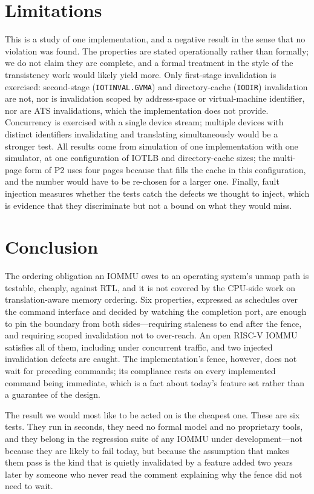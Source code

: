\documentclass[journal]{IEEEtran}
\newcommand{\cmd}[1]{\mbox{\texttt{#1}}}
\begin{document}
\section{Limitations}
This is a study of one implementation, and a negative result in the sense that
no violation was found. The properties are stated operationally rather than
formally; we do not claim they are complete, and a formal treatment in the style
of the transistency work would likely yield more. Only first-stage invalidation
is exercised: second-stage (\cmd{IOTINVAL.GVMA}) and directory-cache
(\cmd{IODIR}) invalidation are not, nor is invalidation scoped by
address-space or virtual-machine identifier, nor are ATS invalidations, which
the implementation does not provide. Concurrency is exercised with a single
device stream; multiple devices with distinct identifiers invalidating and
translating simultaneously would be a stronger test. All results come from
simulation of one implementation with one simulator, at one configuration of
IOTLB and directory-cache sizes; the multi-page form of P2 uses four pages
because that fills the cache in this configuration, and the number would have to
be re-chosen for a larger one. Finally, fault injection measures whether the
tests catch the defects we thought to inject, which is evidence that they
discriminate but not a bound on what they would miss.

\section{Conclusion}
The ordering obligation an IOMMU owes to an operating system's unmap path is
testable, cheaply, against RTL, and it is not covered by the CPU-side work on
translation-aware memory ordering. Six properties, expressed as schedules over
the command interface and decided by watching the completion port, are enough to
pin the boundary from both sides---requiring staleness to end after the fence,
and requiring scoped invalidation not to over-reach. An open RISC-V IOMMU
satisfies all of them, including under concurrent traffic, and two injected
invalidation defects are caught. The implementation's fence, however, does not
wait for preceding commands; its compliance rests on every implemented command
being immediate, which is a fact about today's feature set rather than a
guarantee of the design.

The result we would most like to be acted on is the cheapest one. These are six
tests. They run in seconds, they need no formal model and no proprietary tools,
and they belong in the regression suite of any IOMMU under development---not
because they are likely to fail today, but because the assumption that makes
them pass is the kind that is quietly invalidated by a feature added two years
later by someone who never read the comment explaining why the fence did not
need to wait.
\end{document}
